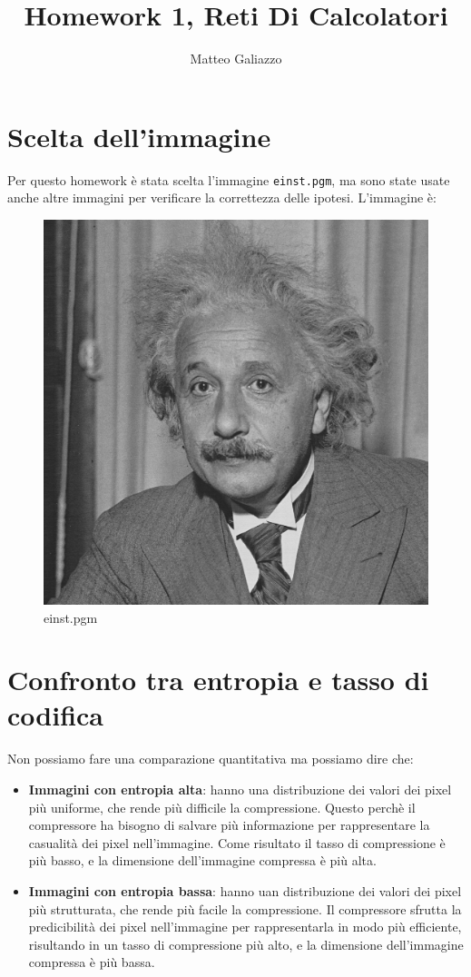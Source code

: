 \documentclass{article}
\title{Homework 1, Reti Di Calcolatori}
\author{Matteo Galiazzo}
\begin{document}
\maketitle

\tableofcontents

\section{Scelta dell'immagine}

Per questo homework è stata scelta l'immagine \verb|einst.pgm|, ma sono state usate anche altre immagini per verificare la correttezza delle ipotesi.
L'immagine è:
\begin{figure}[h]
    \centering
    \includegraphics[width=0.4\linewidth]{einst.png}
    \caption{einst.pgm}
    \label{fig:einst_pgm}
\end{figure}

\section{Confronto tra entropia e tasso di codifica}

Non possiamo fare una comparazione quantitativa ma possiamo dire che:
\begin{itemize}
    \item \textbf{Immagini con entropia alta}: hanno una distribuzione dei valori dei pixel più uniforme, che rende più difficile la compressione.
    Questo perchè il compressore ha bisogno di salvare più informazione per rappresentare la casualità dei pixel nell'immagine.
    Come risultato il tasso di compressione è più basso, e la dimensione dell'immagine compressa è più alta.
    
    \item \textbf{Immagini con entropia bassa}: hanno uan distribuzione dei valori dei pixel più strutturata, che rende più facile la compressione.
    Il compressore sfrutta la predicibilità dei pixel nell'immagine per rappresentarla in modo più efficiente, risultando in un tasso di compressione più alto, e la dimensione dell'immagine compressa è più bassa.
\end{itemize}
\end{document}
